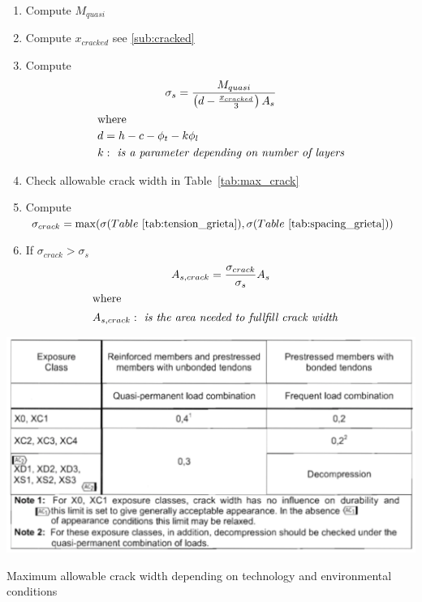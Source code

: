 \documentclass[landscape]{article}
\begin{document}
\begin{multicols*}{2}
\begin{enumerate}
  \item Compute $M_{quasi}$
  \item Compute $x_{cracked}$ see \ref{sub:cracked}
  \item Compute
  \begin{gather}\label{eq:1.4}
        \sigma_s =  \frac{M_{quasi}}{\left(d- \frac{x_{cracked}}{3}\right)A_s}\\
        \shortintertext{where}
        \begin{aligned}
          & d = h - c - \phi_t -k\phi_l\\
          & k: \emph{ is a parameter depending on number of layers}
        \end{aligned}\notag
    \end{gather}
  \item Check allowable crack width in Table~\ref{tab:max_crack}
  \item Compute  $\sigma_{crack} = \max( \sigma (Table~\ref{tab:tension_grieta}), \sigma (Table~\ref{tab:spacing_grieta}))$
  \item If $\sigma_{crack}> \sigma_s$
    \begin{gather}\label{eq:1.4}
        A_{s,crack} = \frac{\sigma_{crack}}{\sigma_s} A_s\\
        \shortintertext{where}
        \begin{aligned}
          & A_{s,crack}: \emph{ is the area needed to fullfill crack width}
        \end{aligned}\notag
    \end{gather}
\end{enumerate}

\begin{table}[H]
    \centering
    \includegraphics[width=0.8\linewidth]{img/7_1.png}
    \caption{Maximum allowable crack width depending on technology and environmental conditions}
    \label{tab:max_crack}
\end{table}


\end{multicols*}
\end{document}
